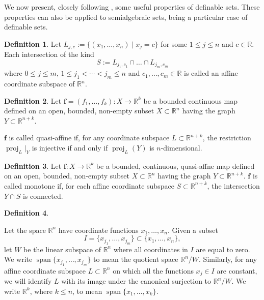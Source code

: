 \documentclass[
]{book}
\theoremstyle{definition}
\newtheorem{definition}{Definition}[chapter]
\theoremstyle{definition}
\theoremstyle{definition}
\theoremstyle{definition}
\theoremstyle{remark}
\begin{document}
We now present, closely following \citet{bgv15}, some useful properties of definable sets. These properties can also be applied to semialgebraic sets, being a particular case of definable sets.

\begin{definition}
\protect\hypertarget{def:affine-coordinate-subspace}{}\label{def:affine-coordinate-subspace}\citep[Definition 2.1]{bgv15}
Let \(L_{j,c} := \{ (x_1,\ldots,x_n) \mid x_j = c \}\) for some \(1 \le j \le n\) and \(c \in \mathbb{R}\).
Each intersection of the kind
\[
S := L_{j_1,c_1} \cap \ldots \cap L_{j_m,c_m}
\]
where \(0 \le j \le m\), \(1 \le j_1 < \cdots < j_m \le n\) and \(c_1,\ldots,c_m \in \mathbb{R}\) is called an affine coordinate subspace of \(\mathbb{R}^n\).
\end{definition}

\begin{definition}
\protect\hypertarget{def:quasi-affine}{}\label{def:quasi-affine}\citep[Definition 2.2]{bgv15}
Let \(\mathbf{f} = (f_1,\ldots,f_k) : X \to \mathbb{R}^k\) be a bounded continuous map defined on an open, bounded, non-empty subset \(X \subset \mathbb{R}^n\) having the graph \(Y \subset \mathbb{R}^{n+k}\).

\(\mathbf{f}\) is called quasi-affine if, for any coordinate subspace \(L \subset \mathbb{R}^{n+k}\), the restriction \(\operatorname{proj}_{L}\vert_Y\) is injective if and only if \(\operatorname{proj}_{L}(Y)\) is \(n\)-dimensional.
\end{definition}

\begin{definition}
\protect\hypertarget{def:monotone-map}{}\label{def:monotone-map}\citep[Definition 2.3]{bgv15}
Let \(\mathbf{f} : X \to \mathbb{R}^k\) be a bounded, continuous, quasi-affne map defined on an open, bounded, non-empty subset \(X\subset \mathbb{R}^n\) having the graph \(Y \subset \mathbb{R}^{n+k}\). \(\mathbf{f}\) is called monotone if, for each affine coordinate subspace \(S \subset \mathbb{R}^{n+k}\), the intersection \(Y \cap S\) is connected.
\end{definition}

\begin{definition}
\citep[Notation 2.4]{bgv15}

Let the space \(\mathbb{R}^n\) have coordinate functions \(x_1,\ldots,x_n\).
Given a subset
\[
I = \{x_{j_1}, \ldots, x_{j_m} \} \subset \{x_1 ,\ldots, x_n \},
\] let \(W\) be the linear subspace of \(\mathbb{R}^n\) where all coordinates in \(I\) are equal to zero.
We write \({\operatorname{span} \{x_{j_1},\ldots, x_{j_m}\}}\) to mean the
quotient space \(\mathbb{R}^n / W\).
Similarly, for any aﬃne coordinate subspace \(L \subset \mathbb{R}^n\) on which all the
functions \(x_j \in I\) are constant, we will identify \(L\) with its image under the canonical surjection
to \(\mathbb{R}^n / W\). We write \(\mathbb{R}^k\), where \(k \le n\), to mean \({\operatorname{span} \{x_1, \ldots, x_k \}}\).
\end{definition}
\end{document}
